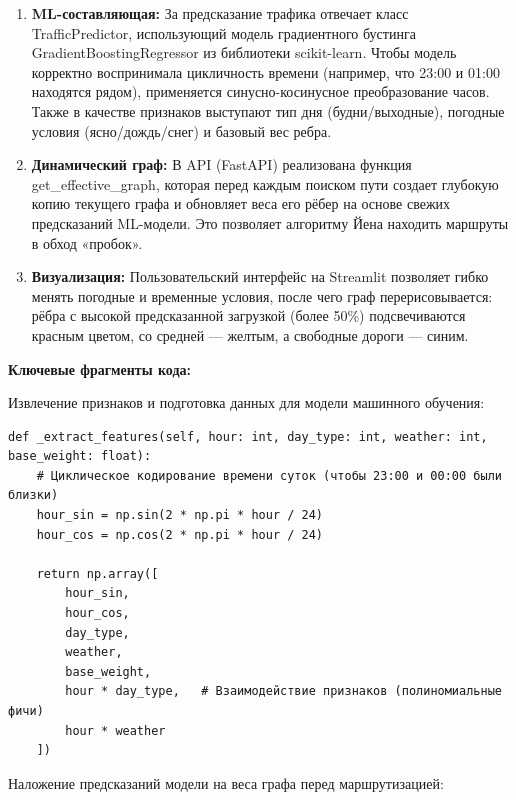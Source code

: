 \documentclass[referat]{SCWorks}
\begin{document}
    \begin{enumerate}
        \item \textbf{ML-составляющая:} За предсказание трафика отвечает класс TrafficPredictor, использующий модель градиентного бустинга GradientBoostingRegressor из библиотеки scikit-learn. Чтобы модель корректно воспринимала цикличность времени (например, что 23:00 и 01:00 находятся рядом), применяется синусно-косинусное преобразование часов. Также в качестве признаков выступают тип дня (будни/выходные), погодные условия (ясно/дождь/снег) и базовый вес ребра.





        \item \textbf{Динамический граф:} В API (FastAPI) реализована функция get\_effective\_graph, которая перед каждым поиском пути создает глубокую копию текущего графа и обновляет веса его рёбер на основе свежих предсказаний ML-модели. Это позволяет алгоритму Йена находить маршруты в обход «пробок».





        \item \textbf{Визуализация:} Пользовательский интерфейс на Streamlit позволяет гибко менять погодные и временные условия, после чего граф перерисовывается: рёбра с высокой предсказанной загрузкой (более 50\%) подсвечиваются красным цветом, со средней — желтым, а свободные дороги — синим.





    \end{enumerate}
    \textbf{Ключевые фрагменты кода:}

    Извлечение признаков и подготовка данных для модели машинного обучения:

    \begin{verbatim}
def _extract_features(self, hour: int, day_type: int, weather: int, base_weight: float):
    # Циклическое кодирование времени суток (чтобы 23:00 и 00:00 были близки)
    hour_sin = np.sin(2 * np.pi * hour / 24)
    hour_cos = np.cos(2 * np.pi * hour / 24)

    return np.array([
        hour_sin,
        hour_cos,
        day_type,
        weather,
        base_weight,
        hour * day_type,   # Взаимодействие признаков (полиномиальные фичи)
        hour * weather
    ])
    \end{verbatim}


    Наложение предсказаний модели на веса графа перед маршрутизацией:
\end{document}
